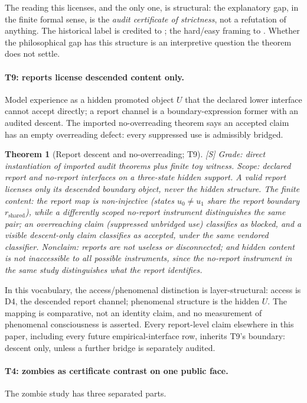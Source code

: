 \documentclass[11pt]{article}
\newcommand{\gradeS}{\textsf{[S]}}
\newtheorem{theorem}{Theorem}[section]
\theoremstyle{definition}
\begin{document}
The reading this licenses, and the only one, is structural: the
explanatory gap, in the finite formal sense, is the \emph{audit certificate of
strictness}, not a refutation of anything. The historical label is credited to
\citet{Levine1983}; the hard/easy framing to \citet{Chalmers1995FacingUp}.
Whether the philosophical gap has this structure is an interpretive question
the theorem does not settle.

\paragraph{T9: reports license descended content only.}
Model experience as a hidden promoted object $U$ that the declared lower
interface cannot accept directly; a report channel is a boundary-expression
former with an audited descent. The imported no-overreading theorem says an
accepted claim has an empty overreading defect: every suppressed use is
admissibly bridged.

\begin{theorem}[Report descent and no-overreading; T9]
\gradeS{} \emph{Grade:} direct instantiation of imported audit theorems plus
finite toy witness. \emph{Scope:} declared report and no-report interfaces on
a three-state hidden support. A valid report licenses only its descended
boundary object, never the hidden structure. The finite content: the report
map is non-injective (states $u_0 \neq u_1$ share the report boundary
$r_{\mathrm{shared}}$), while a differently scoped no-report instrument
distinguishes the same pair; an overreaching claim (suppressed unbridged use)
classifies as blocked, and a visible descent-only claim classifies as
accepted, under the same vendored classifier. \emph{Nonclaim:} reports are
not useless or disconnected; and hidden content is not inaccessible to all
possible instruments, since the no-report instrument in the same study
distinguishes what the report identifies.
\end{theorem}

In this vocabulary, the access/phenomenal distinction \citep{Block1995} is
layer-structural: access is D4, the descended report channel; phenomenal
structure is the hidden $U$. The mapping is comparative, not an identity
claim, and no measurement of phenomenal consciousness is asserted. Every
report-level claim elsewhere in this paper, including every future
empirical-interface row, inherits T9's boundary: descent only, unless a
further bridge is separately audited.

\paragraph{T4: zombies as certificate contrast on one public face.}
The zombie study has three separated parts.
\end{document}
